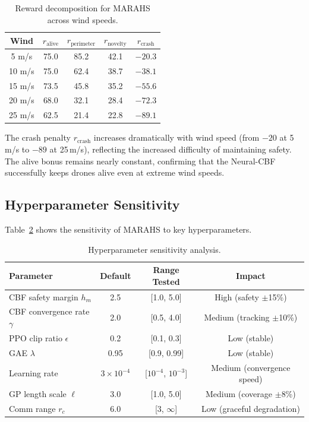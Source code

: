 \documentclass[12pt,a4paper]{article}
\begin{document}
\begin{table}[t]
\centering
\caption{Reward decomposition for MARAHS across wind speeds.}
\label{tab:reward_decomp}
\begin{tabular}{ccccc}
\toprule
\textbf{Wind} & $r_{\text{alive}}$ & $r_{\text{perimeter}}$ & $r_{\text{novelty}}$ & $r_{\text{crash}}$ \\
\midrule
5 m/s  & 75.0 & 85.2 & 42.1 & $-20.3$ \\
10 m/s & 75.0 & 62.4 & 38.7 & $-38.1$ \\
15 m/s & 73.5 & 45.8 & 35.2 & $-55.6$ \\
20 m/s & 68.0 & 32.1 & 28.4 & $-72.3$ \\
25 m/s & 62.5 & 21.4 & 22.8 & $-89.1$ \\
\bottomrule
\end{tabular}
\end{table}

The crash penalty $r_{\text{crash}}$ increases dramatically with wind speed (from $-20$ at 5\,m/s to $-89$ at 25\,m/s), reflecting the increased difficulty of maintaining safety. The alive bonus remains nearly constant, confirming that the Neural-CBF successfully keeps drones alive even at extreme wind speeds.

\subsection{Hyperparameter Sensitivity}

Table~\ref{tab:hyperparam_sensitivity} shows the sensitivity of MARAHS to key hyperparameters.

\begin{table}[t]
\centering
\caption{Hyperparameter sensitivity analysis.}
\label{tab:hyperparam_sensitivity}
\begin{tabular}{lccc}
\toprule
\textbf{Parameter} & \textbf{Default} & \textbf{Range Tested} & \textbf{Impact} \\
\midrule
CBF safety margin $h_m$ & 2.5 & [1.0, 5.0] & High (safety $\pm$15\%) \\
CBF convergence rate $\gamma$ & 2.0 & [0.5, 4.0] & Medium (tracking $\pm$10\%) \\
PPO clip ratio $\epsilon$ & 0.2 & [0.1, 0.3] & Low (stable) \\
GAE $\lambda$ & 0.95 & [0.9, 0.99] & Low (stable) \\
Learning rate & $3\times10^{-4}$ & [$10^{-4}$, $10^{-3}$] & Medium (convergence speed) \\
GP length scale $\ell$ & 3.0 & [1.0, 5.0] & Medium (coverage $\pm$8\%) \\
Comm range $r_c$ & 6.0 & [3, $\infty$] & Low (graceful degradation) \\
\bottomrule
\end{tabular}
\end{table}
\end{document}

